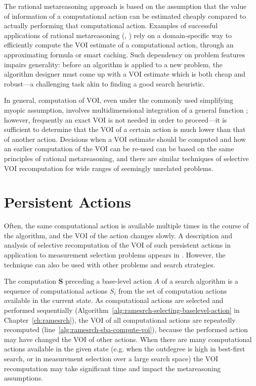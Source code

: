 The rational metareasoning approach is based on the assumption that
the value of information of a computational action can be estimated
cheaply compared to actually performing that computational action. Examples of
successful applications of rational metareasoning
(\cite{Russell.gametree}, \cite{Larson.deliberation_equilibrium}) rely
on a domain-specific way to efficiently compute the VOI estimate of a
computational action, through an approximating formula or smart
caching. Such dependency on problem features impairs generality:
before an algorithm is applied to a new problem, the algorithm
designer must come up with a VOI estimate which is both cheap and
robust---a challenging task akin to finding a good search heuristic.

In general, computation of VOI, even under the commonly used
simplifying myopic assumption, involves multidimensional integration
of a general function \cite{Russell.right}; however, frequently an
exact VOI is not needed in order to proceed---it is sufficient to
determine that the VOI of a certain action is much lower than that of
another action. Decisions when a VOI estimate should be computed and how
an earlier computation of the VOI can be re-used can be  based on the
same principles of rational metareasoning, and there are similar
techniques of selective VOI recomputation for wide ranges of seemingly
unrelated problems.

\section{Persistent Actions}
\label{sec:raticomp-persistent-actions}

Often, the same computational action is available multiple times
in the course of the algorithm, and the VOI of the action changes
slowly. A description and analysis of selective recomputation of
the VOI of such persistent actions in application to measurement selection
problems appears in \cite{Tolpin.raticomp}.  However, the technique
can also be used with other problems and search strategies.

The computation $\mathbf{S}$ preceding a base-level action $A$ of a
search algorithm is a sequence of computational actions $S_i$ from the
set of computation actions available in the current state.
As computational actions are selected and performed sequentially
(Algorithm~\ref{alg:ramesrch-selecting-baselevel-action} in
Chapter~\ref{ch:ramesrch}), the VOI of all computational actions are
repeatedly recomputed (line~\ref{alg:ramesrch-sba-compute-voi}),
because the performed action may have changed the VOI of other
actions. When there are many computational actions available in the
given state (e.g. when the outdegree is high in best-first search, or
in measurement selection over a large search space) the VOI
recomputation may take significant time and impact the metareasoning
assumptions.


